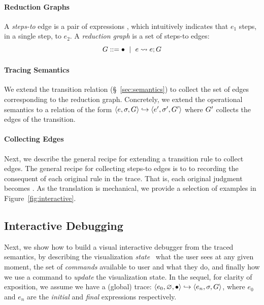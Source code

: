 \paragraph{Reduction Graphs}
%
A \emph{steps-to} edge is a pair of expressions , which
intuitively indicates that $e_1$ steps, in a single step, to $e_2$.
%
%
A \emph{reduction graph} is a set of steps-to edges:
$$G ::= \bullet \ \mid \  e \leadsto e; G$$  %

\paragraph{Tracing Semantics}
%
We extend the transition relation (\S~\ref{sec:semantics}) to
collect the set of edges corresponding to the reduction graph.
%
Concretely, we extend the operational semantics to
a relation of the form $\langle e, \sigma, G \rangle \hookrightarrow \langle e', \sigma', G' \rangle$
where $G'$ collects the edges of the transition.

\paragraph{Collecting Edges}
%
Next, we describe the general recipe for extending a transition
rule to collect edges.
%
The general recipe for collecting steps-to edges is to
to recording the consequent of each original rule in the
trace. That is, each original judgment 
becomes .
%
As the translation is mechanical, we provide a selection of examples
in Figure~\ref{fig:interactive}.



\subsection{Interactive Debugging}
\label{sec:traversing-graph}

Next, we show how to build a visual interactive debugger
from the traced semantics, by describing the visualization
\emph{state} \ie\ what the user sees at any given moment,
the set of \emph{commands} available to user and what
they do, and finally how we use a command to \emph{update}
the visualization state. In the sequel, for clarity of
exposition, we assume we have a (global) trace:
$\langle e_0, \varnothing, \bullet \rangle \hookrightarrow \langle e_n, \sigma, G \rangle$, where
$e_0$ and $e_n$ are the \emph{initial} and \emph{final}
expressions respectively.

